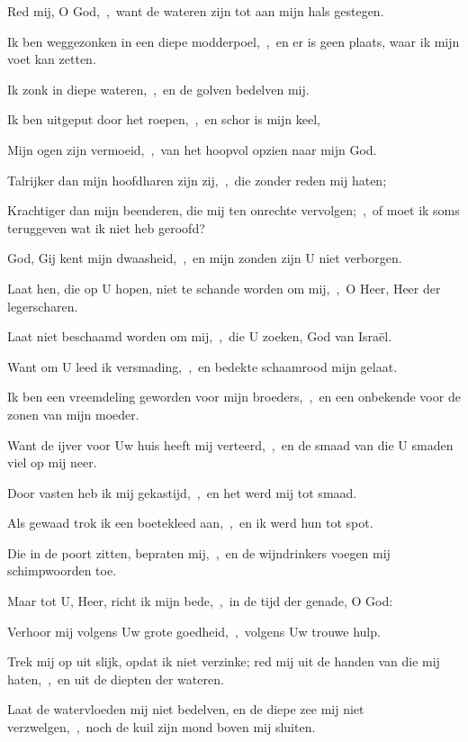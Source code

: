 \documentclass[12pt,twoside,a5paper]{article}
\begin{document}
\begin{halfparskip}
   Red mij, O God,~\sep\ want de wateren zijn tot aan mijn hals gestegen.

  Ik ben weggezonken in een diepe modderpoel,~\sep\ en er is geen plaats, waar ik mijn voet kan zetten.


  Ik zonk in diepe wateren,~\sep\ en de golven bedelven mij.

  Ik ben uitgeput door het roepen,~\sep\ en schor is mijn keel,

  Mijn ogen zijn vermoeid,~\sep\ van het hoopvol opzien naar mijn God.

  Talrijker dan mijn hoofdharen zijn zij,~\sep\ die zonder reden mij haten;

  Krachtiger dan mijn beenderen, die mij ten onrechte vervolgen;~\sep\ of moet ik soms teruggeven wat ik niet heb geroofd?

  God, Gij kent mijn dwaasheid,~\sep\ en mijn zonden zijn U niet verborgen.

  Laat hen, die op U hopen, niet te schande worden om mij,~\sep\ O Heer, Heer der legerscharen.

  Laat niet beschaamd worden om mij,~\sep\ die U zoeken, God van Israël.

  Want om U leed ik versmading,~\sep\ en bedekte schaamrood mijn gelaat.

  Ik ben een vreemdeling geworden voor mijn broeders,~\sep\ en een onbekende voor de zonen van mijn moeder.

  Want de ijver voor Uw huis heeft mij verteerd,~\sep\ en de smaad van die U smaden viel op mij neer.

  Door vasten heb ik mij gekastijd,~\sep\ en het werd mij tot smaad.

  Als gewaad trok ik een boetekleed aan,~\sep\ en ik werd hun tot spot.

  Die in de poort zitten, bepraten mij,~\sep\ en de wijndrinkers voegen mij schimpwoorden toe.

  Maar tot U, Heer, richt ik mijn bede,~\sep\ in de tijd der genade, O God:

  Verhoor mij volgens Uw grote goedheid,~\sep\ volgens Uw trouwe hulp.

  Trek mij op uit slijk, opdat ik niet verzinke; red mij uit de handen van die mij haten,~\sep\ en uit de diepten der wateren.

  Laat de watervloeden mij niet bedelven, en de diepe zee mij niet verzwelgen,~\sep\ noch de kuil zijn mond boven mij sluiten.


\end{halfparskip}
\end{document}
